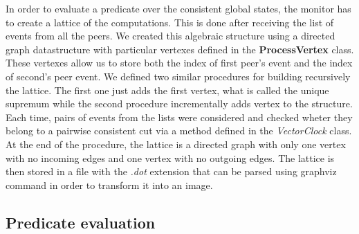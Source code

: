 \documentclass[11pt]{article}
\begin{document}
In order to evaluate a predicate over the consistent global states, the monitor has to create a lattice of the computations. This is done after receiving the list of events from all the peers. We created this algebraic structure using a directed graph datastructure with particular vertexes defined in the \textbf{ProcessVertex} class. These vertexes allow us to store both the index of first peer's event and the index of second's peer event. We defined two similar procedures for building recursively the lattice. The first one just adds the first vertex, what is called the unique supremum while the second procedure incrementally adds vertex to the structure. Each time, pairs of events from the lists were considered and checked wheter they belong to a pairwise consistent cut via a method defined in the \textit{VectorClock} class. At the end of the procedure, the lattice is a directed graph with only one vertex with no incoming edges and one vertex with no outgoing edges. The lattice is then stored in a file with the \textit{.dot} extension that can be parsed using graphviz command in order to transform it into an image.

\subsection{Predicate evaluation}
\end{document}
